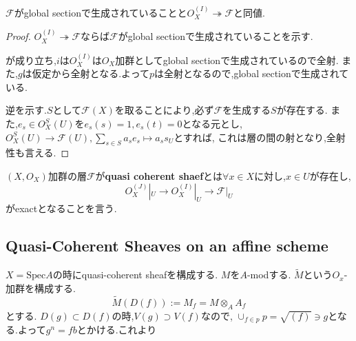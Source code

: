 \begin{lem}
 $\mathcal{F}$がglobal sectionで生成されていることと$O_X^{(I)} \twoheadrightarrow \mathcal{F}$と同値.
\end{lem}
\begin{proof}
$O_X^{(I)} \twoheadrightarrow \mathcal{F}$ならば$\mathcal{F}$がglobal sectionで生成されていることを示す.


が成り立ち,$i$は$O_X^{(I)}$は$O_X$加群としてglobal sectionで生成されているので全射.
また,$g$は仮定から全射となる.よって$p$は全射となるので,global sectionで生成されている.

逆を示す.$S$として$\mathcal{F}(X)$を取ることにより,必ず$\mathcal{F}$を生成する$S$が存在する.
また,$e_s \in O_X^S(U)$を$e_s(s) = 1, e_s(t) = 0$となる元とし,
$O_X^{S}(U) \to \mathcal{F}(U), \sum_{s \in S} a_s e_s \mapsto a_s s_U$とすれば,
これは層の間の射となり,全射性も言える.
\end{proof}


\begin{screen}
\begin{dfn}
$(X, O_X)$加群の層$\mathcal{F}$が\textbf{quasi coherent shaef}とは$\forall x \in X$に対し,$x \in U$が存在し,
\begin{equation*}
  O_X^{(J)}|_U \to O_X^{(I)}|_U \to \mathcal{F}|_U
\end{equation*}
がexactとなることを言う.
\end{dfn}
\end{screen}

\subsection{Quasi-Coherent Sheaves on an affine scheme}
$X = \mathrm{Spec}A$の時にquasi-coherent sheafを構成する.
$M$を$A$-modする.
$\tilde{M}$という$O_x$-加群を構成する.
\begin{equation*}
\tilde{M}(D(f)) := M_f = M \otimes_A A_f
\end{equation*}
とする.
$D(g) \subset D(f)$の時,$V(g) \supset V(f)$なので,
$\cup_{f \in p}p  = \sqrt{(f)} \ni g$となる.よって$g^n = fb$とかける.これより

